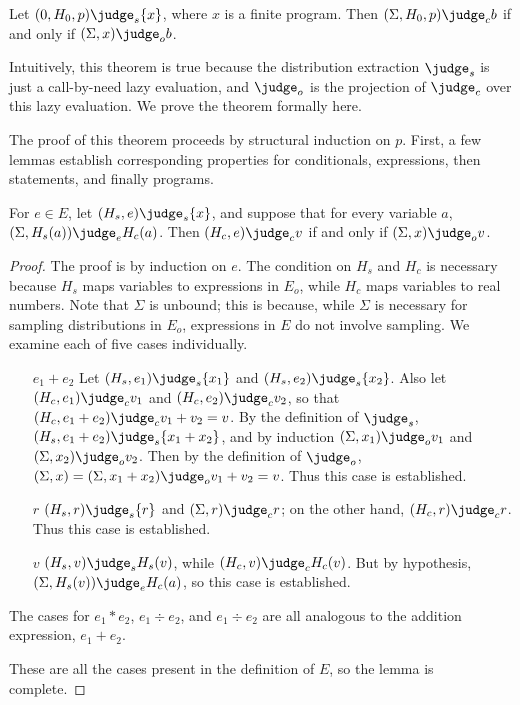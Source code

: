 \begin{theorem} \label{passert:thm:main}
Let $(0, H_0, p) \judge_s \{ x \}$, where $x$ is a finite program.
Then $(\Sigma, H_0, p) \judge_c b$ if and only if $(\Sigma, x) \judge_o b$.
\end{theorem}

Intuitively, this theorem is true because the distribution extraction
$\judge_s$ is just a call-by-need lazy evaluation, and $\judge_o$ is
the projection of $\judge_c$ over this lazy evaluation.  We prove the
theorem formally here.

The proof of this theorem proceeds by structural induction on $p$.
First, a few lemmas establish corresponding properties for
conditionals, expressions, then statements, and finally programs.

\begin{lemma} \label{passert:lem:expr}
  For $e \in E$, let $(H_s, e) \judge_s \{ x \}$, and suppose that for
  every variable $a$, $(\Sigma, H_s(a)) \judge_e H_c(a)$.  Then $(H_c,
  e) \judge_c v$ if and only if $(\Sigma, x) \judge_o v$.
\end{lemma}

\begin{proof}
The proof is by induction on $e$.  The condition on $H_s$ and $H_c$ is
necessary because $H_s$ maps variables to expressions in $E_o$, while
$H_c$ maps variables to real numbers.  Note that $\Sigma$ is unbound;
this is because, while $\Sigma$ is necessary for sampling
distributions in $E_o$, expressions in $E$ do not involve sampling.
We examine each of five cases individually.

\begin{itemize}
\item[$e_1 + e_2$] Let $(H_s, e_1) \judge_s \{ x_1 \}$ and $(H_s, e_2)
  \judge_s \{ x_2 \}$. Also let $(H_c, e_1) \judge_c v_1$ and $(H_c,
  e_2) \judge_c v_2$, so that $(H_c, e_1 + e_2) \judge_c v_1 + v_2 =
  v$.  By the definition of $\judge_s$, $(H_s, e_1 + e_2) \judge_s \{
  x_1 + x_2 \}$, and by induction $(\Sigma, x_1) \judge_o v_1$ and
  $(\Sigma, x_2) \judge_o v_2$.  Then by the definition of $\judge_o$,
  $(\Sigma, x) = (\Sigma, x_1 + x_2) \judge_o v_1 + v_2 = v$.  Thus
  this case is established.
\item[$r$] $(H_s, r) \judge_s \{ r \}$ and $(\Sigma, r) \judge_c r$;
  on the other hand, $(H_c, r) \judge_c r$.  Thus this case is
  established.
\item[$v$] $(H_s, v) \judge_s H_s(v)$, while $(H_c, v) \judge_c
  H_c(v)$.  But by hypothesis, $(\Sigma, H_s(v)) \judge_e H_c(a)$, so
  this case is established.
\end{itemize}

The cases for $e_1 * e_2$, $e_1 \div e_2$, and $e_1 \div e_2$ are all
analogous to the addition expression, $e_1 + e_2$.

These are all the cases present in the definition of $E$, so the lemma
is complete.

\end{proof}


